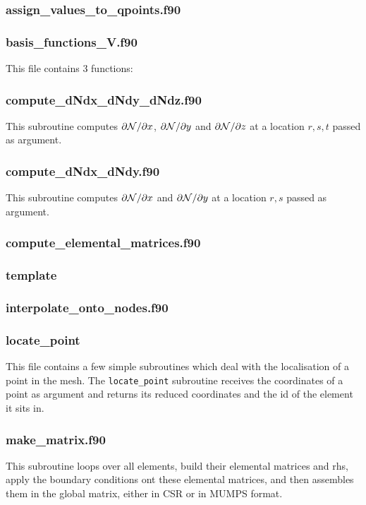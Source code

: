  \subsubsection{assign\_values\_to\_qpoints.f90}

 \subsubsection{basis\_functions\_V.f90}
 This file contains 3 functions: 
 \subsubsection{compute\_dNdx\_dNdy\_dNdz.f90}
 This subroutine computes $\partial{{\mathcal{N}}}/\partial x$, $\partial{{\mathcal{N}}}/\partial y$ and
 $\partial{{\mathcal{N}}}/\partial z$ at a location $r,s,t$ passed as argument.
 \subsubsection{compute\_dNdx\_dNdy.f90}
 This subroutine computes $\partial{{\mathcal{N}}}/\partial x$ and $\partial{{\mathcal{N}}}/\partial y$
 at a location $r,s$ passed as argument.
 \subsubsection{compute\_elemental\_matrices.f90}

 \subsubsection{template}

 \subsubsection{interpolate\_onto\_nodes.f90}

 \subsubsection{locate\_point}
 This file contains a few simple subroutines which deal with the localisation of a point 
 in the mesh. The {\tt locate\_point} subroutine receives the coordinates of a point as argument 
 and returns its reduced coordinates and the id of the element it sits in.
 
 \subsubsection{make\_matrix.f90}
 This subroutine loops over all elements, build their elemental matrices and rhs, 
 apply the boundary conditions ont these elemental matrices, and then 
 assembles them in the global matrix, either in CSR or in MUMPS format.
